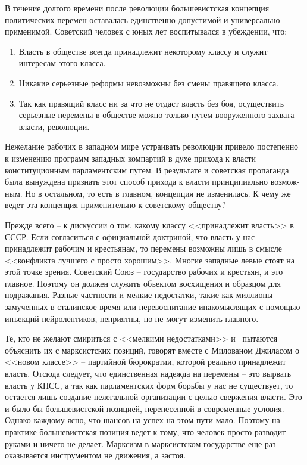 \documentclass{book}
\begin{document}
В течение долгого времени после революции большевистская концепция политических перемен оставалась единственно допустимой и универсально применимой. Советский человек с юных лет воспитывался в убеждении, что:

\begin{enumerate}
 \item Власть в обществе всегда принадлежит некоторому клас­су и служит интересам этого класса.
 \item Никакие серьезные реформы невозможны без смены правящего класса.
 \item Так как правящий класс ни за что не отдаст власть без боя, осуществить серьезные перемены в обществе можно толь­ко путем вооруженного захвата власти, революции.
\end{enumerate}

Нежелание рабочих в западном мире устраивать революции привело постепенно к изменению 
программ западных компар­тий в духе прихода к власти конституционным парламентским 
путем. В результате и советская пропаганда была вынуждена признать этот способ 
прихода к власти принципиально возмож­ным. Но в остальном, то есть в главном, 
концепция не измени­лась. К чему же ведет эта концепция применительно к советско­му 
обществу?

Прежде всего -- к дискуссии о том, какому классу <<принад­лежит власть>> в СССР. Если 
согласиться с официальной доктри­ной, что власть у нас принадлежит рабочим и 
крестьянам, то перемены возможны лишь в смысле <<конфликта лучшего с просто 
хорошим>>. Многие западные левые стоят на этой точке зрения. Советский Союз -- 
государство рабочих и крестьян, и это главное. Поэтому он должен служить объектом 
восхищения и образцом для подражания. Разные частности и мелкие недо­статки, такие как 
миллионы замученных в сталинское время или перевоспитание инакомыслящих с помощью 
инъекций нейролептиков, неприятны, но не могут изменить главного.

Те, кто не желают смириться с <<мелкими недостатками>> и  пытаются объяснить их с 
марксистских позиций, говорят вместе с Милованом Джиласом о <<новом классе>> --
пар\-тий\-ной бюрократии, которой реально принадлежит власть. Отсюда следует, что 
единственная надежда на перемены -- это вырвать власть у КПСС, а так как 
парламентских форм борьбы у нас не существует, то остается лишь создание нелегальной 
организации с целью свержения власти. Это и было бы большевистской позицией, 
перенесенной в современные условия. Однако каждому ясно, что шансов на успех на этом 
пути мало. Поэтому на практике большевистская позиция ведет к тому, что человек 
просто разводит руками и ничего не делает. Марксизм в марксистском государстве еще 
раз оказывается инструментом не движения, а застоя.
\end{document}
